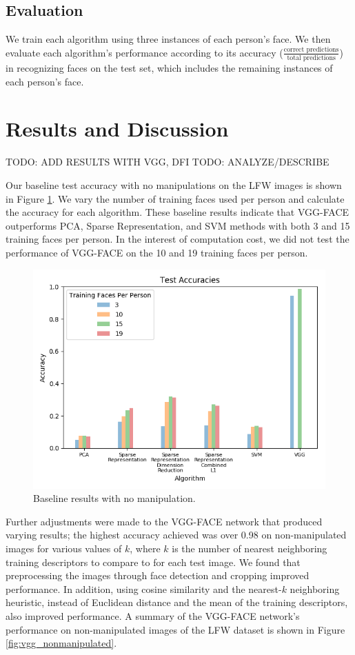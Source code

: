 \documentclass[pageno]{cos429}
\begin{document}
\subsection{Evaluation}
We train each algorithm using three instances of each person's face. We then evaluate each algorithm's performance according to its accuracy ($\frac{\textrm{correct predictions}}{\textrm{total predictions}}$) in recognizing faces on the test set, which includes the remaining instances of each person's face.

\section{Results and Discussion}
TODO: ADD RESULTS WITH VGG, DFI
TODO: ANALYZE/DESCRIBE

Our baseline test accuracy with no manipulations on the LFW images is shown in Figure \ref{fig:baseline}. We vary the number of training faces used per person and calculate the accuracy for each algorithm. These baseline results indicate that VGG-FACE outperforms PCA, Sparse Representation, and SVM methods with both 3 and 15 training faces per person. In the interest of computation cost, we did not test the performance of VGG-FACE on the 10 and 19 training faces per person.

\begin{figure}
\centering
\includegraphics[scale=0.5]{../figures/results_plots/default_accuracies_difftraintest.png}
\caption{Baseline results with no manipulation.}
\label{fig:baseline}
\end{figure}

Further adjustments were made to the VGG-FACE network that produced varying results; the highest accuracy achieved was over 0.98 on non-manipulated images for various values of $k$, where $k$ is the number of nearest neighboring training descriptors to compare to for each test image. We found that preprocessing the images through face detection and cropping improved performance. In addition, using cosine similarity and the nearest-$k$ neighboring heuristic, instead of Euclidean distance and the mean of the training descriptors, also improved performance. A summary of the VGG-FACE network's performance on non-manipulated images of the LFW dataset is shown in Figure \ref{fig:vgg_nonmanipulated}. 
\end{document}
